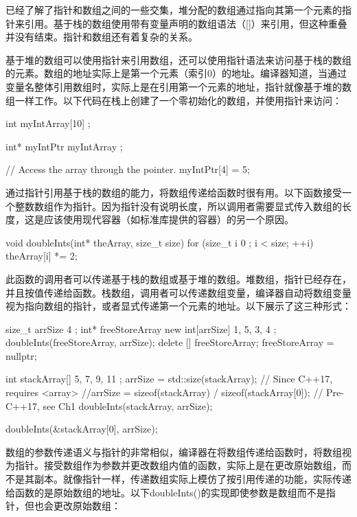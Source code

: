 
已经了解了指针和数组之间的一些交集，堆分配的数组通过指向其第一个元素的指针来引用。基于栈的数组使用带有变量声明的数组语法（[]）来引用，但这种重叠并没有结束。指针和数组还有着复杂的关系。


基于堆的数组可以使用指针来引用数组，还可以使用指针语法来访问基于栈的数组的元素。数组的地址实际上是第一个元素（索引0）的地址。编译器知道，当通过变量名整体引用数组时，实际上是在引用第一个元素的地址，指针就像基于堆的数组一样工作。以下代码在栈上创建了一个零初始化的数组，并使用指针来访问：

\begin{cpp}
int myIntArray[10] {};

int* myIntPtr { myIntArray };

// Access the array through the pointer.
myIntPtr[4] = 5;
\end{cpp}

通过指针引用基于栈的数组的能力，将数组传递给函数时很有用。以下函数接受一个整数数组作为指针。因为指针没有说明长度，所以调用者需要显式传入数组的长度，这是应该使用现代容器（如标准库提供的容器）的另一个原因。

\begin{cpp}
void doubleInts(int* theArray, size_t size)
{
    for (size_t i { 0 }; i < size; ++i) { theArray[i] *= 2; }
}
\end{cpp}

此函数的调用者可以传递基于栈的数组或基于堆的数组。堆数组，指针已经存在，并且按值传递给函数。栈数组，调用者可以传递数组变量，编译器自动将数组变量视为指向数组的指针，或者显式传递第一个元素的地址。以下展示了这三种形式：

\begin{cpp}
size_t arrSize { 4 };
int* freeStoreArray { new int[arrSize]{ 1, 5, 3, 4 } };
doubleInts(freeStoreArray, arrSize);
delete [] freeStoreArray;
freeStoreArray = nullptr;

int stackArray[] { 5, 7, 9, 11 };
arrSize = std::size(stackArray); // Since C++17, requires <array>
//arrSize = sizeof(stackArray) / sizeof(stackArray[0]); // Pre-C++17, see Ch1
doubleInts(stackArray, arrSize);

doubleInts(&stackArray[0], arrSize);
\end{cpp}

数组的参数传递语义与指针的非常相似，编译器在将数组传递给函数时，将数组视为指针。接受数组作为参数并更改数组内值的函数，实际上是在更改原始数组，而不是其副本。就像指针一样，传递数组实际上模仿了按引用传递的功能，实际传递给函数的是原始数组的地址。以下doubleInts()的实现即使参数是数组而不是指针，但也会更改原始数组：

